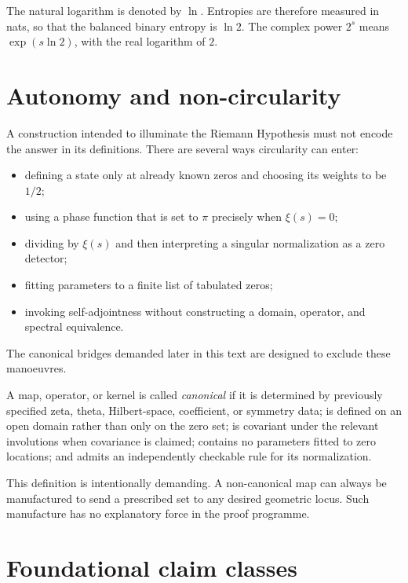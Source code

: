 The natural logarithm is denoted by $\ln$. Entropies are therefore measured in nats, so that the balanced binary entropy is $\ln2$. The complex power $2^s$ means $\exp(s\ln2)$, with the real logarithm of $2$.

\section{Autonomy and non-circularity}

A construction intended to illuminate the Riemann Hypothesis must not encode the answer in its definitions. There are several ways circularity can enter:
\begin{itemize}
  \item defining a state only at already known zeros and choosing its weights to be $1/2$;
  \item using a phase function that is set to $\pi$ precisely when $\xi(s)=0$;
  \item dividing by $\xi(s)$ and then interpreting a singular normalization as a zero detector;
  \item fitting parameters to a finite list of tabulated zeros;
  \item invoking self-adjointness without constructing a domain, operator, and spectral equivalence.
\end{itemize}
The canonical bridges demanded later in this text are designed to exclude these manoeuvres.

\begin{definition}
A map, operator, or kernel is called \emph{canonical} if it is determined by previously specified zeta, theta, Hilbert-space, coefficient, or symmetry data; is defined on an open domain rather than only on the zero set; is covariant under the relevant involutions when covariance is claimed; contains no parameters fitted to zero locations; and admits an independently checkable rule for its normalization.
\end{definition}

This definition is intentionally demanding. A non-canonical map can always be manufactured to send a prescribed set to any desired geometric locus. Such manufacture has no explanatory force in the proof programme.

\section{Foundational claim classes}

